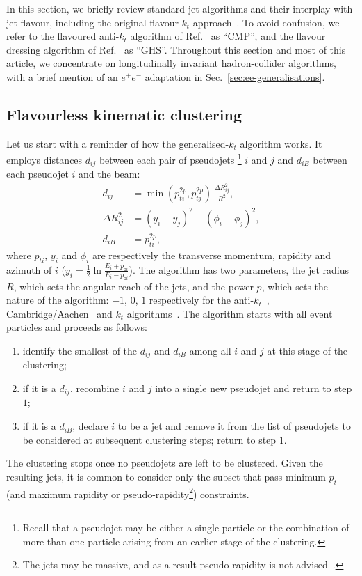 \documentclass[nofootinbib,twocolumn,preprintnumbers,superscriptaddress,aps]{revtex4-2}
\newcommand{\DR}{\Delta R}
\begin{document}
In this section, we briefly review standard jet algorithms and their interplay with jet flavour, including the original flavour-$k_t$ approach~\cite{Banfi:2006hf}.
%
To avoid confusion, we refer to the flavoured anti-$k_t$ algorithm of Ref.~\cite{Czakon:2022wam} as ``CMP'', and the flavour dressing algorithm of Ref.~\cite{Gauld:2022lem} as ``GHS''.
%
Throughout this section and most of this article, we concentrate on longitudinally invariant hadron-collider algorithms, with a brief mention of an $e^+ e^-$ adaptation in Sec.~\ref{sec:ee-generalisations}.

\subsection{Flavourless kinematic clustering}

Let us start with a reminder of how the generalised-$k_t$ algorithm
works.
%
It employs distances $d_{ij}$ between each pair of
pseudojets%
%
\footnote{Recall that a pseudojet may be either a single
  particle or the combination of more than one particle arising from
  an earlier stage of the clustering.}
  $i$ and $j$ and $d_{iB}$
between each pseudojet $i$ and the beam:
%
\begin{subequations}
  \label{eq:genkt-distances}
  \begin{align}
    \label{eq:genkt-dij}
    d_{ij} &= \min(p_{ti}^{2p}, p_{tj}^{2p})
             \,\frac{\Delta R_{ij}^2}{R^2},
    \\
    \DR_{ij}^2 &= (y_i-y_j)^2 + (\phi_i - \phi_j)^2,
    \\
    \label{eq:genkt-diB}
    d_{iB} &= p_{ti}^{2p},
  \end{align}
\end{subequations}
where $p_{ti}$, $y_i$ and $\phi_i$ are respectively the transverse
momentum, rapidity and azimuth of $i$
($y_i = \frac12\ln \frac{E_i + p_{zi}}{E_i - p_{zi}}$).
%
The algorithm has two parameters, the jet radius $R$, which sets the
angular reach of the jets, and the power $p$, which sets the nature of
the algorithm: $-1$, $0$, $1$ respectively for the anti-$k_t$~\cite{Cacciari:2008gp},
Cambridge/Aachen~\cite{Dokshitzer:1997in,Wobisch:1998wt} and $k_t$
algorithms~\cite{Catani:1993hr,Ellis:1993tq}. 
%
The algorithm starts with all event particles and proceeds as follows:
\begin{enumerate}
\item identify the smallest of the $d_{ij}$ and $d_{iB}$ among all $i$
  and $j$ at this stage of the clustering;
\item if it is a $d_{ij}$, recombine $i$ and $j$ into a single
  new pseudojet and return to step $1$;
\item if it is a $d_{iB}$, declare $i$ to be a jet and remove it from
  the list of pseudojets to be considered at subsequent clustering
  steps; return to step 1.
\end{enumerate}
The clustering stops once no pseudojets are left to be clustered.
%
Given the resulting jets, it is common to consider only the subset
that pass minimum $p_t$ (and maximum rapidity or
pseudo-rapidity\footnote{The jets may be massive, and as a result
  pseudo-rapidity is not advised~\cite{Gallicchio:2018elx}.})  constraints.
\end{document}

